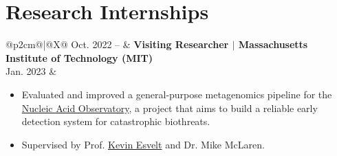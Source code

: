 \documentclass[letterpaper,11pt]{article}
\begin{document}
\section{\textbf{Research Internships}}
\begin{tabularx}{\linewidth}{@{}p{2cm}@{\hspace{5pt}}|@{\hspace{5pt}}X@{}}
    Oct. 2022 -- & 
    \textbf{Visiting Researcher $|$ Massachusetts Institute of Technology (MIT)} \\
    Jan. 2023 & \begin{minipage}[t]{\linewidth}
        \begin{itemize}[noitemsep]
            \item Evaluated and improved a general‐purpose metagenomics pipeline for the \href{https://naobservatory.org/}{\color{teal}Nucleic Acid Observatory}, a project that aims to build a reliable early detection system for catastrophic biothreats.
            \item Supervised by Prof. \href{https://www.media.mit.edu/people/esvelt/overview/}{\color{teal}Kevin Esvelt} and Dr. Mike McLaren.
        \end{itemize}
    \end{minipage}
\end{tabularx}


\end{document}
